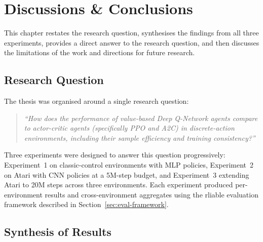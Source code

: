 
\chapter{Discussions \& Conclusions}
\label{chap:conclusions}


\ifpdf
    \graphicspath{{7_conclusions/figures/PNG/}{7_conclusions/figures/PDF/}{7_conclusions/figures/}}
\else
    \graphicspath{{7_conclusions/figures/EPS/}{7_conclusions/figures/}}
\fi


This chapter restates the research question, synthesises the findings
from all three experiments, provides a direct answer to the research
question, and then discusses the limitations of the work and directions
for future research.

\section{Research Question}

The thesis was organised around a single research question:

\begin{quote}
\textit{``How does the performance of value-based Deep Q-Network agents
compare to actor-critic agents (specifically PPO and A2C) in
discrete-action environments, including their sample efficiency and
training consistency?''}
\end{quote}

Three experiments were designed to answer this question progressively:
Experiment~1 on classic-control environments with MLP policies,
Experiment~2 on Atari with CNN policies at a 5M-step budget, and
Experiment~3 extending Atari to 20M steps across three environments.
Each experiment produced per-environment results and cross-environment
aggregates using the rliable evaluation framework described in
Section~\ref{sec:eval-framework}.

\section{Synthesis of Results}


